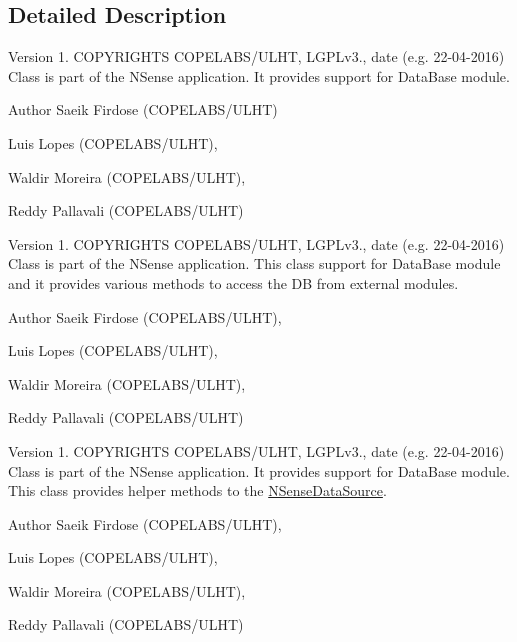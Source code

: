 \subsection{Detailed Description}
\begin{DoxyVersion}{Version}
1. C\-O\-P\-Y\-R\-I\-G\-H\-T\-S C\-O\-P\-E\-L\-A\-B\-S/\-U\-L\-H\-T, L\-G\-P\-Lv3., date (e.\-g. 22-\/04-\/2016) Class is part of the N\-Sense application. It provides support for Data\-Base module. 
\end{DoxyVersion}
\begin{DoxyAuthor}{Author}
Saeik Firdose (C\-O\-P\-E\-L\-A\-B\-S/\-U\-L\-H\-T) 

Luis Lopes (C\-O\-P\-E\-L\-A\-B\-S/\-U\-L\-H\-T), 

Waldir Moreira (C\-O\-P\-E\-L\-A\-B\-S/\-U\-L\-H\-T), 

Reddy Pallavali (C\-O\-P\-E\-L\-A\-B\-S/\-U\-L\-H\-T)
\end{DoxyAuthor}
\begin{DoxyVersion}{Version}
1. C\-O\-P\-Y\-R\-I\-G\-H\-T\-S C\-O\-P\-E\-L\-A\-B\-S/\-U\-L\-H\-T, L\-G\-P\-Lv3., date (e.\-g. 22-\/04-\/2016) Class is part of the N\-Sense application. This class support for Data\-Base module and it provides various methods to access the D\-B from external modules. 
\end{DoxyVersion}
\begin{DoxyAuthor}{Author}
Saeik Firdose (C\-O\-P\-E\-L\-A\-B\-S/\-U\-L\-H\-T), 

Luis Lopes (C\-O\-P\-E\-L\-A\-B\-S/\-U\-L\-H\-T), 

Waldir Moreira (C\-O\-P\-E\-L\-A\-B\-S/\-U\-L\-H\-T), 

Reddy Pallavali (C\-O\-P\-E\-L\-A\-B\-S/\-U\-L\-H\-T)
\end{DoxyAuthor}
\begin{DoxyVersion}{Version}
1. C\-O\-P\-Y\-R\-I\-G\-H\-T\-S C\-O\-P\-E\-L\-A\-B\-S/\-U\-L\-H\-T, L\-G\-P\-Lv3., date (e.\-g. 22-\/04-\/2016) Class is part of the N\-Sense application. It provides support for Data\-Base module. This class provides helper methods to the \hyperlink{classcs_1_1nsense_1_1db_1_1_n_sense_data_source}{N\-Sense\-Data\-Source}. 
\end{DoxyVersion}
\begin{DoxyAuthor}{Author}
Saeik Firdose (C\-O\-P\-E\-L\-A\-B\-S/\-U\-L\-H\-T), 

Luis Lopes (C\-O\-P\-E\-L\-A\-B\-S/\-U\-L\-H\-T), 

Waldir Moreira (C\-O\-P\-E\-L\-A\-B\-S/\-U\-L\-H\-T), 

Reddy Pallavali (C\-O\-P\-E\-L\-A\-B\-S/\-U\-L\-H\-T) 
\end{DoxyAuthor}
